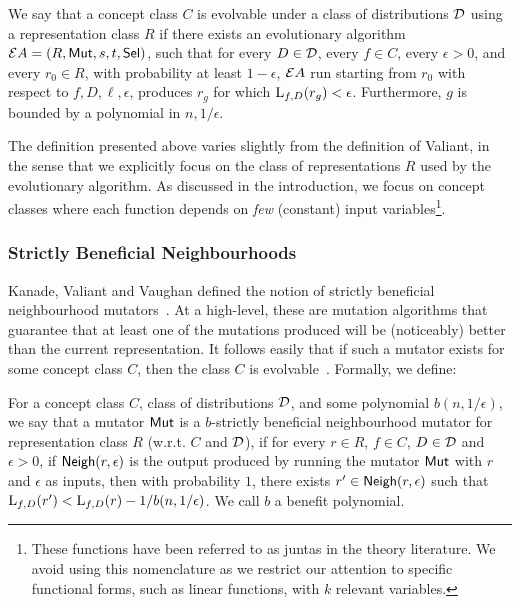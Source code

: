\begin{definition} We say that a
concept class $C$ is evolvable under a class of distributions ${\mathcal D}$ using a
representation class $R$ if there exists an evolutionary algorithm ${\mathcal EA} =
(R, \mathsf{Mut}, s, t, \mathsf{Sel})$, such that for every $D \in {\mathcal D}$, every $f \in C$,
every $\epsilon > 0$, and every $r_0 \in R$, with probability at least $1 -
\epsilon$, ${\mathcal EA}$ run starting from $r_0$ with respect to $f, D, \ell, \epsilon$,
produces $r_g$ for which $\mathrm{L}_{f, D}(r_g) < \epsilon$. Furthermore, $g$ is
bounded by a polynomial in $n, 1/\epsilon$.  \end{definition}

The definition presented above varies slightly from the definition of Valiant,
in the sense that we explicitly focus on the class of representations $R$ used
by the evolutionary algorithm. As discussed in the introduction, we focus on
concept classes where each function depends on \emph{few} (constant) input
variables\footnote{These functions have been referred to as juntas in the theory
literature. We avoid using this nomenclature as we restrict our attention to
specific functional forms, such as linear functions, with $k$ relevant
variables.}. 

\subsubsection{Strictly Beneficial Neighbourhoods}

Kanade, Valiant and Vaughan defined the notion of strictly beneficial
neighbourhood mutators~\cite{KVV:2010-drift}. At a high-level, these are
mutation algorithms that guarantee that at least one of the mutations produced
will be (noticeably) better than the current representation. It follows easily
that if such a mutator exists for some concept class $C$, then the class $C$ is
evolvable~\cite{KVV:2010-drift}. Formally, we define:

\begin{definition} For a concept
class $C$, class of distributions ${\mathcal D}$, and some polynomial $b(n,
1/\epsilon)$, we say that a mutator $\mathsf{Mut}$ is a $b$-strictly beneficial
neighbourhood mutator for representation class $R$ (w.r.t. $C$ and ${\mathcal D}$), if
for every $r \in R$, $f \in C$, $D \in {\mathcal D}$ and $\epsilon > 0$, if
$\mathsf{Neigh}(r, \epsilon)$ is the output produced by running the mutator $\mathsf{Mut}$ with
$r$ and $\epsilon$ as inputs, then with probability $1$, there exists $r^\prime
\in \mathsf{Neigh}(r, \epsilon)$ such that $\mathrm{L}_{f, D}(r^\prime) < \mathrm{L}_{f, D}(r) -
1/b(n, 1/\epsilon)$. We call $b$ a benefit polynomial. \end{definition}

